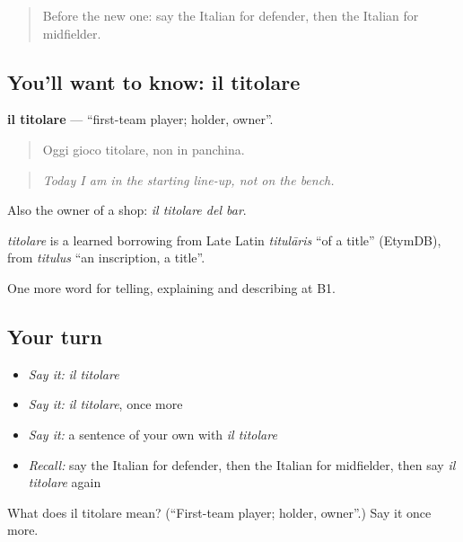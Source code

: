 \begin{quote}
Before the new one: say the Italian for defender, then the Italian for midfielder.
\end{quote}

\subsection*{You'll want to know: il titolare}
\textbf{il titolare} — \textquotedblleft{}first-team player; holder, owner\textquotedblright{}.

\begin{quote}
Oggi gioco titolare, non in panchina.
\end{quote}

\begin{quote}
\emph{Today I am in the starting line-up, not on the bench.}
\end{quote}

Also the owner of a shop: \emph{il titolare del bar}.

\begin{cousinweb}
\emph{titolare} is a learned borrowing from Late Latin \emph{titulāris} \textquotedblleft{}of a title\textquotedblright{} (EtymDB), from \emph{titulus} \textquotedblleft{}an inscription, a title\textquotedblright{}.
\end{cousinweb}

\begin{grammarlens}[title={What you've built}]
One more word for telling, explaining and describing at B1.
\end{grammarlens}

\subsection*{Your turn}
\begin{itemize}
\raggedright
  \item \emph{Say it:} \emph{il titolare}
  \item \emph{Say it:} \emph{il titolare}, once more
  \item \emph{Say it:} a sentence of your own with \emph{il titolare}
  \item \emph{Recall:} say the Italian for defender, then the Italian for midfielder, then say \emph{il titolare} again
\end{itemize}

\begin{tcolorbox}[breakable,colback=teal!4,colframe=teal!35!black,title={Before you move on}]
What does il titolare mean? (\textquotedblleft{}First-team player; holder, owner\textquotedblright{}.) Say it once more.
\end{tcolorbox}
